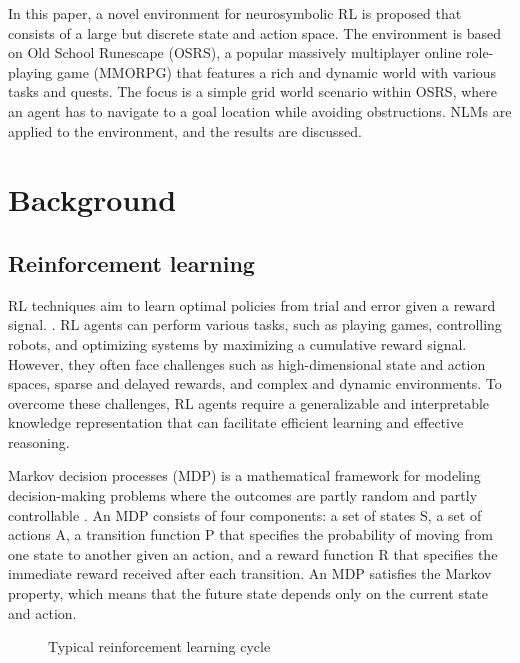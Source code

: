 \documentclass{article}
\begin{document}
In this paper, a novel environment for neurosymbolic RL is proposed that consists of a large but discrete state and action space. The environment is based on Old School Runescape (OSRS), a popular massively multiplayer online role-playing game (MMORPG) that features a rich and dynamic world with various tasks and quests. The focus is a simple grid world scenario within OSRS, where an agent has to navigate to a goal location while avoiding obstructions. NLMs are applied to the environment, and the results are discussed.


\section{Background}
\subsection{Reinforcement learning}
RL techniques aim to learn optimal policies from trial and error given a reward signal. \cite{sutton2018reinforcement}. RL agents can perform various tasks, such as playing games, controlling robots, and optimizing systems by maximizing a cumulative reward signal. However, they often face challenges such as high-dimensional state and action spaces, sparse and delayed rewards, and complex and dynamic environments. To overcome these challenges, RL agents require a generalizable and interpretable knowledge representation that can facilitate efficient learning and effective reasoning.

Markov decision processes (MDP) is a mathematical framework for modeling decision-making problems where the outcomes are partly random and partly controllable \cite{puterman2014markov}. An MDP consists of four components: a set of states S, a set of actions A, a transition function P that specifies the probability of moving from one state to another given an action, and a reward function R that specifies the immediate reward received after each transition. An MDP satisfies the Markov property, which means that the future state depends only on the current state and action.

\begin{figure}[h]
  
  \centering
  
  \caption{Typical reinforcement learning cycle}
\end{figure}
\end{document}
